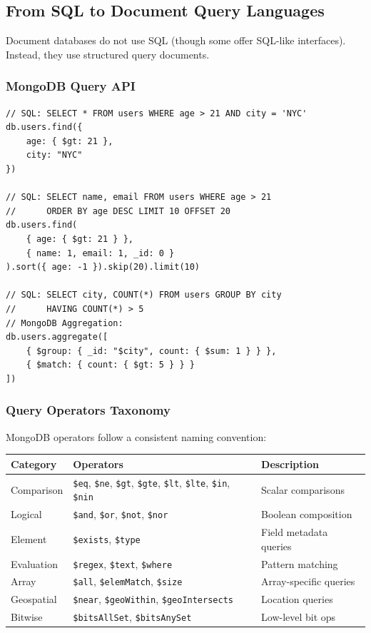 \documentclass[12pt,a4paper]{article}
\begin{document}
\subsection{From SQL to Document Query Languages}

Document databases do not use SQL (though some offer SQL-like interfaces). Instead, they use structured query documents.

\subsubsection{MongoDB Query API}

\begin{lstlisting}[language=MongoDB, caption={SQL vs. MongoDB Query Comparison}]
// SQL: SELECT * FROM users WHERE age > 21 AND city = 'NYC'
db.users.find({
    age: { $gt: 21 },
    city: "NYC"
})

// SQL: SELECT name, email FROM users WHERE age > 21
//      ORDER BY age DESC LIMIT 10 OFFSET 20
db.users.find(
    { age: { $gt: 21 } },
    { name: 1, email: 1, _id: 0 }
).sort({ age: -1 }).skip(20).limit(10)

// SQL: SELECT city, COUNT(*) FROM users GROUP BY city
//      HAVING COUNT(*) > 5
// MongoDB Aggregation:
db.users.aggregate([
    { $group: { _id: "$city", count: { $sum: 1 } } },
    { $match: { count: { $gt: 5 } } }
])
\end{lstlisting}

\subsubsection{Query Operators Taxonomy}

MongoDB operators follow a consistent naming convention:

\begin{center}
\begin{tabular}{@{}lll@{}}
\toprule
\textbf{Category} & \textbf{Operators} & \textbf{Description} \\
\midrule
Comparison & \texttt{\$eq}, \texttt{\$ne}, \texttt{\$gt}, \texttt{\$gte}, \texttt{\$lt}, \texttt{\$lte}, \texttt{\$in}, \texttt{\$nin} & Scalar comparisons \\
Logical & \texttt{\$and}, \texttt{\$or}, \texttt{\$not}, \texttt{\$nor} & Boolean composition \\
Element & \texttt{\$exists}, \texttt{\$type} & Field metadata queries \\
Evaluation & \texttt{\$regex}, \texttt{\$text}, \texttt{\$where} & Pattern matching \\
Array & \texttt{\$all}, \texttt{\$elemMatch}, \texttt{\$size} & Array-specific queries \\
Geospatial & \texttt{\$near}, \texttt{\$geoWithin}, \texttt{\$geoIntersects} & Location queries \\
Bitwise & \texttt{\$bitsAllSet}, \texttt{\$bitsAnySet} & Low-level bit ops \\
\bottomrule
\end{tabular}
\end{center}
\end{document}
